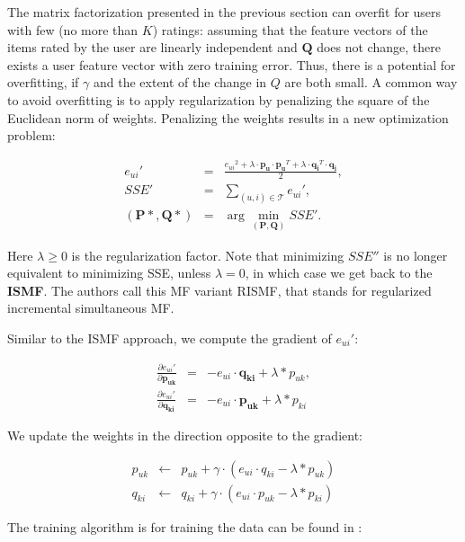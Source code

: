 \documentclass[10pt,a4paper]{article}  %
\begin{document}
The matrix factorization presented in the previous section can overfit for users with few (no more than $K$) ratings: assuming that the feature vectors of the items rated by the user are linearly independent and $\mathbf{Q}$ does not change, there exists a user feature vector with zero training error. Thus, there is a potential for overfitting, if $\gamma$ and the extent of the change in $Q$ are both small. A common way to avoid overfitting is to apply regularization by penalizing the square of the Euclidean norm of weights.
Penalizing the weights results in a new optimization problem:

\begin{eqnarray}
  {e_{ui}}' &=& \frac{{e_{ui}}^2 + \lambda \cdot \mathbf{p_u} \cdot \mathbf{p_u}^T + \lambda \cdot \mathbf{q_i}^T \cdot \mathbf{q_i}}{2}, \nonumber \\
  SSE' &=& \sum_{(u, i) \in \mathcal{T}} {e_{ui}}', \nonumber \\
  (\mathbf{P*}, \mathbf{Q*}) &=& \arg\!\min_{\boldsymbol{(\mathbf{P}, \mathbf{Q})}}SSE'.
\end{eqnarray}

Here $\lambda \ge 0$ is the regularization factor. Note that minimizing $SSE''$ is no longer equivalent to minimizing SSE, unless $\lambda = 0$, in which case we get back to the \textbf{ISMF}. The authors call this MF variant RISMF, that stands for regularized incremental simultaneous MF.

Similar to the ISMF approach, we compute the gradient of ${e_{ui}}'$:

\begin{eqnarray}
  \label{eq:gradient}
  \frac{\partial{e_{ui}}'}{\partial{\mathbf{p_{uk}}}} &=& -e_{ui} \cdot \mathbf{q_{ki}} + \lambda * p_{uk}, \nonumber \\
  \frac{\partial{e_{ui}}'}{\partial{\mathbf{q_{ki}}}} &=& -e_{ui} \cdot \mathbf{p_{uk}} + \lambda * p_{ki} 
\end{eqnarray}

We update the weights in the direction opposite to the gradient:

\begin{eqnarray}
  p_{uk} &\leftarrow& p_{uk} + \gamma \cdot ( e_{ui} \cdot q_{ki} - \lambda * p_{uk} ) \\
  q_{ki} &\leftarrow& q_{ki} + \gamma \cdot ( e_{ui} \cdot p_{uk} - \lambda * p_{ki} )
\end{eqnarray}

The training algorithm is for training the data can be found in \cite{takacs09scalable}:
\end{document}
